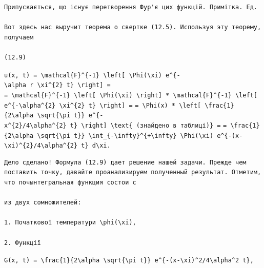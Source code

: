 \documentclass[
  ukrainian,
]{article}
\begin{document}
\begin{verbatim}
Припускається, що існує перетворення Фур'є цих функцій. Примітка. Ед.

Вот здесь нас выручит теорема о свертке (12.5). Используя эту теорему, получаем

(12.9)
\end{verbatim}

\texttt{u(x,\ t)\ =\ \textbackslash{}mathcal\{F\}\^{}\{-1\}\ \textbackslash{}left{[}\ \textbackslash{}Phi(\textbackslash{}xi)\ e\^{}\{-\textbackslash{}alpha\ r\ \textbackslash{}xi\^{}\{2\}\ t\}\ \textbackslash{}right{]}\ =}
\texttt{=\ \textbackslash{}mathcal\{F\}\^{}\{-1\}\ \textbackslash{}left{[}\ \textbackslash{}Phi(\textbackslash{}xi)\ \textbackslash{}right{]}\ *\ \textbackslash{}mathcal\{F\}\^{}\{-1\}\ \textbackslash{}left{[}\ e\^{}\{-\textbackslash{}alpha\^{}\{2\}\ \textbackslash{}xi\^{}\{2\}\ t\}\ \textbackslash{}right{]}\ =}
\texttt{=\ \textbackslash{}Phi(x)\ *\ \textbackslash{}left{[}\ \textbackslash{}frac\{1\}\{2\textbackslash{}alpha\ \textbackslash{}sqrt\{\textbackslash{}pi\ t\}\}\ e\^{}\{-x\^{}\{2\}/4\textbackslash{}alpha\^{}\{2\}\ t\}\ \textbackslash{}right{]}\ \textbackslash{}text\{\ (знайдено\ в\ таблиці)\}\ =}
\texttt{=\ \textbackslash{}frac\{1\}\{2\textbackslash{}alpha\ \textbackslash{}sqrt\{\textbackslash{}pi\ t\}\}\ \textbackslash{}int\_\{-\textbackslash{}infty\}\^{}\{+\textbackslash{}infty\}\ \textbackslash{}Phi(\textbackslash{}xi)\ e\^{}\{-(x-\textbackslash{}xi)\^{}\{2\}/4\textbackslash{}alpha\^{}\{2\}\ t\}\ d\textbackslash{}xi.}

\begin{verbatim}
Дело сделано! Формула (12.9) дает решение нашей задачи. Прежде чем поставить точку, давайте проанализируем полученный результат. Отметим, что почынтегральная функция состои с

из двух сомножителей:

1. Початкової температури \phi(\xi),

2. Функції
\end{verbatim}

\texttt{G(x,\ t)\ =\ \textbackslash{}frac\{1\}\{2\textbackslash{}alpha\ \textbackslash{}sqrt\{\textbackslash{}pi\ t\}\}\ e\^{}\{-(x-\textbackslash{}xi)\^{}2/4\textbackslash{}alpha\^{}2\ t\},}
\end{document}
